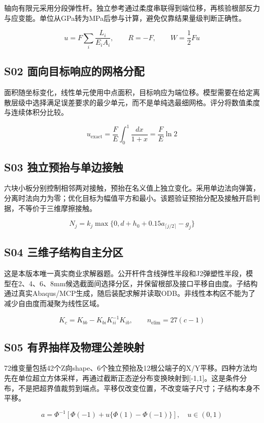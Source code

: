 \documentclass[UTF8,a4paper,11pt,fontset=windows]{ctexart}
\begin{document}
轴向有限元采用分段弹性杆。独立参考通过柔度串联得到端位移，再核验根部反力与应变能。单位从GPa转为MPa后参与计算，避免仅靠结果量级判断正确性。

\[u=F\sum_i\frac{L_i}{E_i A_i},\qquad R=-F,\qquad W=\frac12 Fu\]

\subsection{S02 面向目标响应的网格分配}

面积随坐标变化，线性单元使用中点面积，目标响应为端位移。模型需要在给定离散层级中选择满足误差要求的最少单元，而不是单纯选最细网格。评分将数值柔度与连续体积分比较。

\[u_{\mathrm{exact}}=\frac{F}{E}\int_0^1\frac{dx}{1+x}=\frac{F}{E}\ln2\]

\subsection{S03 独立预抬与单边接触}

六块小板分别控制相邻两对接触，预抬在名义值上独立变化。采用单边法向弹簧，分离时法向力为零；优化目标为幅值平方和最小。该题验证预抬分配及接触开启判据，不等价于三维摩擦接触。

\[N_j=k_j\max\{0,d+h_0+0.15a_{\lceil j/2\rceil}-g_j\}\]

\subsection{S04 三维子结构自主分区}

这是本版本唯一真实商业求解器题。公开杆件含线弹性半段和J2弹塑性半段，模型在2、4、6、8mm候选截面间选择分区，并保留根部及接口平移自由度。子结构通过真实Abaqus/MCP生成，随后装配求解并读取ODB。非线性本构区不能为了减少自由度而凝聚为线性区域。

\[K_c=K_{bb}-K_{bi}K_{ii}^{-1}K_{ib},\qquad n_{\mathrm{elim}}=27(c-1)\]

\subsection{S05 有界抽样及物理公差映射}

72维变量包括42个Z向shape、6个独立预抬及12根公端子的X/Y平移。四种方法均先在单位超立方体采样，再通过截断正态逆分布变换映射到[-1,1]。这是条件分布，不是把超界值裁剪到端点。平移仅改变位置，不改变端子尺寸；子结构本身不平移。

\[a=\Phi^{-1}\!\left[\Phi(-1)+u\{\Phi(1)-\Phi(-1)\}\right],\quad u\in(0,1)\]
\end{document}
